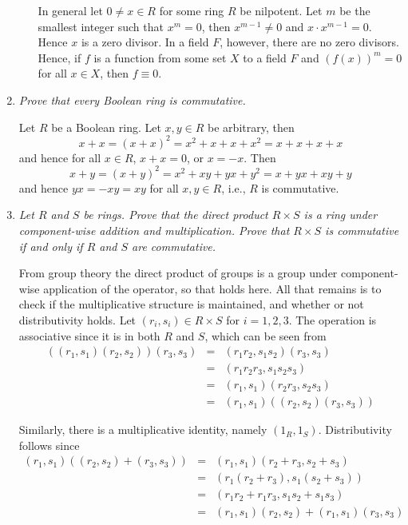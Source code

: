 \documentclass[letterpaper, 11pt]{article}
\begin{document}
\begin{enumerate}
\begin{enumerate}
In general let $0 \neq x \in R$ for some ring $R$ be nilpotent.  Let $m$ be the smallest integer such that $x^m = 0$, then $x^{m-1} \neq 0$ and $x \cdot x^{m-1} = 0$.  Hence $x$ is a zero divisor.  In a field $F$, however, there are no zero divisors.  Hence, if $f$ is a function from some set $X$ to a field $F$ and $\left(f(x)\right)^m = 0$ for all $x \in X$, then $f \equiv 0$.

\end{enumerate}

\item \emph{Prove that every Boolean ring is commutative.}

Let $R$ be a Boolean ring.  Let $x, y \in R$ be arbitrary, then $$x+x = (x+x)^2 = x^2 + x + x + x^2 = x + x + x + x$$ and hence for all $x \in R$, $x+x = 0$, or $x = -x$.  Then $$x+y = (x+y)^2 = x^2 + xy + yx + y^2 = x + yx + xy + y$$ and hence $yx = -xy = xy$ for all $x,y \in R$, i.e., $R$ is commutative.

\item \emph{Let $R$ and $S$ be rings.  Prove that the direct product $R \times S$ is a ring under component-wise addition and multiplication.  Prove that $R \times S$ is commutative if and only if $R$ and $S$ are commutative.}

From group theory the direct product of groups is a group under component-wise application of the operator, so that holds here.  All that remains is to check if the multiplicative structure is maintained, and whether or not distributivity holds.  Let $(r_i, s_i) \in R \times S$ for $i=1,2,3$.  The operation is associative since it is in both $R$ and $S$, which can be seen from
\begin{eqnarray*}
\left((r_1,s_1)(r_2,s_2)\right)(r_3, s_3) &=& (r_1r_2, s_1s_2)(r_3,s_3) \\
&=& (r_1r_2r_3, s_1s_2s_3) \\
&=& (r_1,s_1)(r_2r_3, s_2s_3) \\
&=& (r_1, s_1)\left((r_2,s_2)(r_3,s_3)\right)
\end{eqnarray*}

Similarly, there is a multiplicative identity, namely $(1_R, 1_S)$.  Distributivity follows since
\begin{eqnarray*}
(r_1,s_1)((r_2,s_2) + (r_3,s_3)) &=& (r_1, s_1)(r_2+r_3, s_2+s_3) \\
&=& (r_1(r_2 + r_3), s_1(s_2 + s_3)) \\
&=& (r_1r_2 + r_1r_3, s_1s_2 + s_1s_3) \\
&=& (r_1, s_1)(r_2, s_2) + (r_1,s_1)(r_3, s_3)
\end{eqnarray*}


\end{enumerate}
\end{document}
